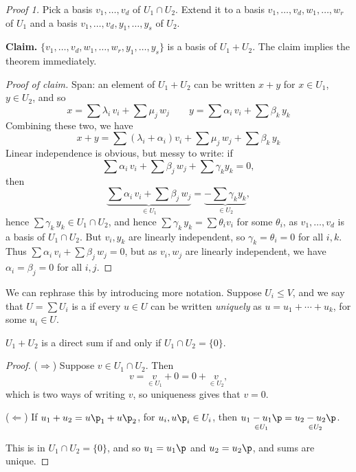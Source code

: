 \begin{proof}
	[Proof 1] Pick a basis $v_1,\ldots,v_d$ of $U_1\cap U_2$. Extend it to a basis $v_1,\ldots,v_d,w_1,\ldots,w_r$ of $U_1$ and a basis $v_1,\ldots,v_d,y_1,\ldots,y_s$ of $U_2$. %
	
	\textbf{Claim.} $\{v_1,\ldots,v_d,w_1,\ldots,w_r,y_1,\ldots,y_s\}$ is a basis of $U_1+U_2$. The claim implies the theorem immediately. %
	
	\emph{Proof of claim.} Span: an element of $U_1+U_2$ can be written $x+y$ for $x\in U_1$, $y\in U_2$, and so %
	\begin{equation*}
		\textstyle
		x = \sum \lambda_i\,v_i + \sum \mu_j\,w_j \qquad
		y = \sum \alpha_i\,v_i + \sum \beta_k\,y_k
	\end{equation*}
	Combining these two, we have
	\begin{equation*}
		\textstyle
		  x+y
		= \sum \left( \lambda_i + \alpha_i \right) v_i
		+ \sum \mu_j\,w_j
		+ \sum \beta_k\,y_k
	\end{equation*}
	Linear independence is obvious, but messy to write: if
	\begin{equation*}
		\textstyle
		\sum \alpha_i\, v_i + \sum \beta_j\,w_j + \sum \gamma_k y_k = 0,
	\end{equation*}
	then
	\begin{equation*}
		\underbrace{\textstyle\sum \alpha_i\,v_i + \sum \beta_j\,w_j}_{\in U_1} = \underbrace{-\textstyle\sum \gamma_k y_k}_{\in U_2}, %
	\end{equation*}
	hence $\sum \gamma_k\,y_k \in U_1 \cap U_2$, and hence $\sum \gamma_k \, y_k = \sum \theta_i v_i$ for some $\theta_i$, as $v_1,\ldots,v_d$ is a basis of $U_1\cap U_2$. But $v_i,y_k$ are linearly independent, so $\gamma_k=\theta_i=0$ for all $i,k$. Thus $\sum \alpha_i\,v_i + \sum \beta_j\,w_j =0$, but as $v_i,w_j$ are linearly independent, we have $\alpha_i = \beta_j = 0$ for all $i,j$. %
\end{proof}

We can rephrase this by introducing more notation. Suppose $U_i\leq V$, and we say that $U=\sum U_i$ is a  if every $u\in U$ can be written \emph{uniquely} as $u=u_1+\cdots+u_k$, for some $u_i\in U$.

\begin{lemma}
	$U_1+U_2$ is a direct sum if and only if $U_1\cap U_2 = \{0\}$. %
\end{lemma}

\begin{proof}
	($\Rightarrow$) Suppose $v\in U_1\cap U_2$. Then
	\begin{equation*}
		v = \underset{\in U_1}{v} + 0 = 0+\underset{\in U_2}{v},
	\end{equation*}
	which is two ways of writing $v$, so uniqueness gives that $v=0$. %
	
	($\Leftarrow$) If $u_1+u_2=u\p_1+u\p_2$, for $u_i, u\p_i\in U_i$, then $\underset{\in U_1}{u_1-u_1\p} = \underset{\in U_2}{u_2-u_2\p}$. %
	
	This is in $U_1\cap U_2 = \{0\}$, and so $u_1=u_1\p$ and $u_2=u_2\p$, and sums are unique. %
\end{proof}

